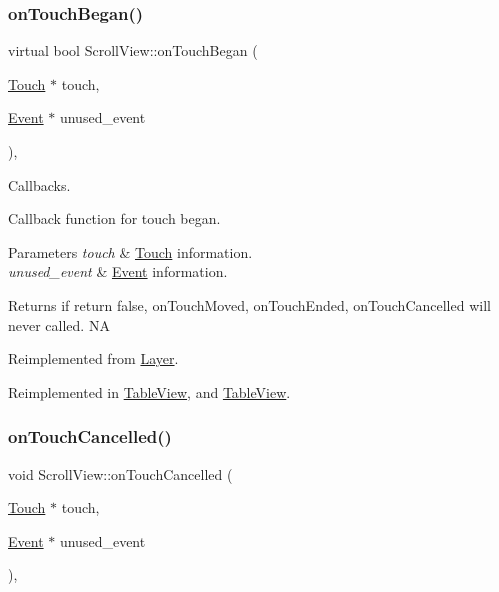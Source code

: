 \subsubsection{\texorpdfstring{on\+Touch\+Began()}{onTouchBegan()}\hspace{0.1cm}{\footnotesize\ttfamily [2/2]}}
{\footnotesize\ttfamily virtual bool Scroll\+View\+::on\+Touch\+Began (\begin{DoxyParamCaption}\item[{\hyperlink{classTouch}{Touch} $\ast$}]{touch,  }\item[{\hyperlink{classEvent}{Event} $\ast$}]{unused\+\_\+event }\end{DoxyParamCaption})\hspace{0.3cm}{\ttfamily [override]}, {\ttfamily [virtual]}}



Callbacks. 

Callback function for touch began.


\begin{DoxyParams}{Parameters}
{\em touch} & \hyperlink{classTouch}{Touch} information. \\
\hline
{\em unused\+\_\+event} & \hyperlink{classEvent}{Event} information. \\
\hline
\end{DoxyParams}
\begin{DoxyReturn}{Returns}
if return false, on\+Touch\+Moved, on\+Touch\+Ended, on\+Touch\+Cancelled will never called.  NA 
\end{DoxyReturn}


Reimplemented from \hyperlink{classLayer_abe632dc131bdeb3d603090d4d31db25c}{Layer}.



Reimplemented in \hyperlink{classTableView_a57908fcd3fe592e50ff721dd84675a01}{Table\+View}, and \hyperlink{classTableView_a195a00658f0ba79be1b59935569c3c7c}{Table\+View}.

\mbox{\label{classScrollView_a48d7dc926fdbd91707e37167dcf4d36f}} 
\subsubsection{\texorpdfstring{on\+Touch\+Cancelled()}{onTouchCancelled()}\hspace{0.1cm}{\footnotesize\ttfamily [1/2]}}
{\footnotesize\ttfamily void Scroll\+View\+::on\+Touch\+Cancelled (\begin{DoxyParamCaption}\item[{\hyperlink{classTouch}{Touch} $\ast$}]{touch,  }\item[{\hyperlink{classEvent}{Event} $\ast$}]{unused\+\_\+event }\end{DoxyParamCaption})\hspace{0.3cm}{\ttfamily [override]}, {\ttfamily [virtual]}}

